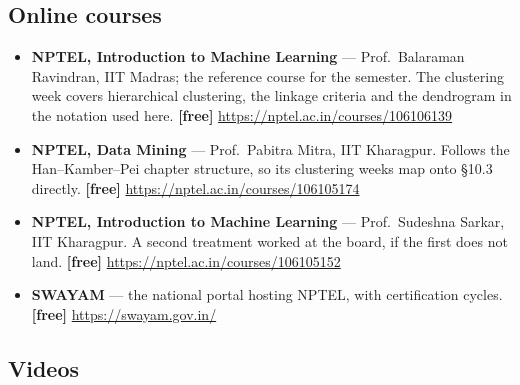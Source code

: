 \documentclass[11pt]{article}
\begin{document}
\subsection*{Online courses}

\begin{sloppypar}
\begin{itemize}[leftmargin=*]
  \item \textbf{NPTEL, Introduction to Machine Learning} --- Prof.\ Balaraman
    Ravindran, IIT Madras; the reference course for the semester. The
    clustering week covers hierarchical clustering, the linkage criteria and
    the dendrogram in the notation used here. \textbf{[free]}
    \url{https://nptel.ac.in/courses/106106139}
  \item \textbf{NPTEL, Data Mining} --- Prof.\ Pabitra Mitra, IIT Kharagpur.
    Follows the Han--Kamber--Pei chapter structure, so its clustering weeks
    map onto \S10.3 directly. \textbf{[free]}
    \url{https://nptel.ac.in/courses/106105174}
  \item \textbf{NPTEL, Introduction to Machine Learning} --- Prof.\ Sudeshna
    Sarkar, IIT Kharagpur. A second treatment worked at the board, if the
    first does not land. \textbf{[free]}
    \url{https://nptel.ac.in/courses/106105152}
  \item \textbf{SWAYAM} --- the national portal hosting NPTEL, with
    certification cycles. \textbf{[free]} \url{https://swayam.gov.in/}
\end{itemize}
\end{sloppypar}

\subsection*{Videos}
\end{document}
